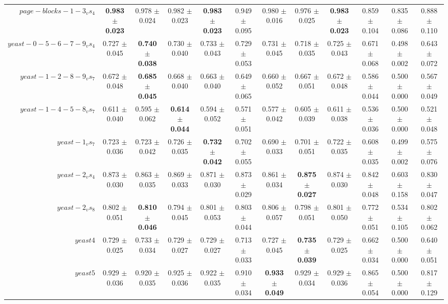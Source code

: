 \begin{table}[!ht]
{\begin{tabular}{r c c c c c c c c c c c}
$page-blocks-1-3_vs_4$ & \textbf{0.983 $\pm$ 0.023} & 0.978 $\pm$ 0.024 & 0.982 $\pm$ 0.023 & \textbf{0.983 $\pm$ 0.023} & 0.949 $\pm$ 0.095 & 0.980 $\pm$ 0.016 & 0.976 $\pm$ 0.025 & \textbf{0.983 $\pm$ 0.023} & 0.859 $\pm$ 0.104 & 0.835 $\pm$ 0.086 & 0.888 $\pm$ 0.110 \\
$yeast-0-5-6-7-9_vs_4$ & 0.727 $\pm$ 0.045 & \textbf{0.740 $\pm$ 0.038} & 0.730 $\pm$ 0.040 & 0.733 $\pm$ 0.043 & 0.729 $\pm$ 0.053 & 0.731 $\pm$ 0.045 & 0.718 $\pm$ 0.035 & 0.725 $\pm$ 0.043 & 0.671 $\pm$ 0.068 & 0.498 $\pm$ 0.002 & 0.643 $\pm$ 0.072 \\
$yeast-1-2-8-9_vs_7$ & 0.672 $\pm$ 0.048 & \textbf{0.685 $\pm$ 0.045} & 0.668 $\pm$ 0.040 & 0.663 $\pm$ 0.040 & 0.649 $\pm$ 0.065 & 0.660 $\pm$ 0.052 & 0.667 $\pm$ 0.051 & 0.672 $\pm$ 0.048 & 0.586 $\pm$ 0.044 & 0.500 $\pm$ 0.000 & 0.567 $\pm$ 0.049 \\
$yeast-1-4-5-8_vs_7$ & 0.611 $\pm$ 0.040 & 0.595 $\pm$ 0.062 & \textbf{0.614 $\pm$ 0.044} & 0.594 $\pm$ 0.052 & 0.571 $\pm$ 0.051 & 0.577 $\pm$ 0.042 & 0.605 $\pm$ 0.039 & 0.611 $\pm$ 0.038 & 0.536 $\pm$ 0.036 & 0.500 $\pm$ 0.000 & 0.521 $\pm$ 0.048 \\
$yeast-1_vs_7$ & 0.723 $\pm$ 0.036 & 0.723 $\pm$ 0.042 & 0.726 $\pm$ 0.035 & \textbf{0.732 $\pm$ 0.042} & 0.702 $\pm$ 0.055 & 0.690 $\pm$ 0.033 & 0.701 $\pm$ 0.051 & 0.722 $\pm$ 0.035 & 0.608 $\pm$ 0.035 & 0.499 $\pm$ 0.002 & 0.575 $\pm$ 0.076 \\
$yeast-2_vs_4$ & 0.873 $\pm$ 0.030 & 0.863 $\pm$ 0.035 & 0.869 $\pm$ 0.033 & 0.871 $\pm$ 0.030 & 0.873 $\pm$ 0.029 & 0.861 $\pm$ 0.034 & \textbf{0.875 $\pm$ 0.027} & 0.874 $\pm$ 0.030 & 0.842 $\pm$ 0.048 & 0.603 $\pm$ 0.158 & 0.830 $\pm$ 0.047 \\
$yeast-2_vs_8$ & 0.802 $\pm$ 0.051 & \textbf{0.810 $\pm$ 0.046} & 0.794 $\pm$ 0.045 & 0.801 $\pm$ 0.053 & 0.803 $\pm$ 0.044 & 0.806 $\pm$ 0.057 & 0.798 $\pm$ 0.051 & 0.801 $\pm$ 0.050 & 0.772 $\pm$ 0.051 & 0.534 $\pm$ 0.105 & 0.802 $\pm$ 0.062 \\
$yeast4$ & 0.729 $\pm$ 0.025 & 0.733 $\pm$ 0.034 & 0.729 $\pm$ 0.027 & 0.729 $\pm$ 0.027 & 0.713 $\pm$ 0.033 & 0.727 $\pm$ 0.045 & \textbf{0.735 $\pm$ 0.039} & 0.729 $\pm$ 0.025 & 0.662 $\pm$ 0.034 & 0.500 $\pm$ 0.000 & 0.640 $\pm$ 0.051 \\
$yeast5$ & 0.929 $\pm$ 0.036 & 0.920 $\pm$ 0.035 & 0.925 $\pm$ 0.036 & 0.922 $\pm$ 0.035 & 0.910 $\pm$ 0.034 & \textbf{0.933 $\pm$ 0.049} & 0.929 $\pm$ 0.034 & 0.929 $\pm$ 0.036 & 0.865 $\pm$ 0.054 & 0.500 $\pm$ 0.000 & 0.817 $\pm$ 0.129 \\

\end{tabular}}
\end{table}
